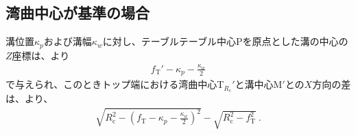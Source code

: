 \subsection{湾曲中心が基準の場合}
溝位置$\kappa_p$および溝幅$\kappa_w$に対し、テーブルテーブル中心Pを原点とした溝の中心の$Z$座標は、より
\begin{align*}
  f_\mathrm T'-\kappa_p-\frac{\kappa_w}2
\end{align*}
で与えられ、このときトップ端における湾曲中心T$_{R_\mathrm c}'$と溝中心M$'$との$X$方向の差は、より、
\begin{align}
  \sqrt{R_\mathrm c^2-\left(f_\mathrm T-\kappa_p-\frac{\kappa_w}2\right)^{\!2}}
  -\sqrt{R_\mathrm c^2-f_\mathrm T^2}\ .
\end{align}








